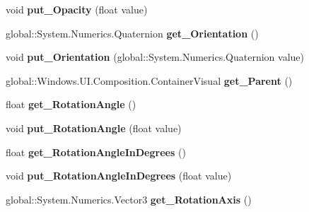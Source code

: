 \begin{DoxyCompactItemize}
void {\bfseries put\+\_\+\+Opacity} (float value)
\item 
\mbox{\label{interface_windows_1_1_u_i_1_1_composition_1_1_i_visual_a523dd4814f2f36f236cfe45314be2dd0}} 
global\+::\+System.\+Numerics.\+Quaternion {\bfseries get\+\_\+\+Orientation} ()
\item 
\mbox{\label{interface_windows_1_1_u_i_1_1_composition_1_1_i_visual_ac0ab83605b6773e888073ad16337ad3f}} 
void {\bfseries put\+\_\+\+Orientation} (global\+::\+System.\+Numerics.\+Quaternion value)
\item 
\mbox{\label{interface_windows_1_1_u_i_1_1_composition_1_1_i_visual_a134bed2c4c5639f5afd9a8ea755bd39a}} 
global\+::\+Windows.\+U\+I.\+Composition.\+Container\+Visual {\bfseries get\+\_\+\+Parent} ()
\item 
\mbox{\label{interface_windows_1_1_u_i_1_1_composition_1_1_i_visual_abefcdbefc02e45c1a846f29a0b173f5d}} 
float {\bfseries get\+\_\+\+Rotation\+Angle} ()
\item 
\mbox{\label{interface_windows_1_1_u_i_1_1_composition_1_1_i_visual_a57dea19f8a26f8727219fb97a7df55e7}} 
void {\bfseries put\+\_\+\+Rotation\+Angle} (float value)
\item 
\mbox{\label{interface_windows_1_1_u_i_1_1_composition_1_1_i_visual_aff19cf9eed640a1a17a06464d5ccc102}} 
float {\bfseries get\+\_\+\+Rotation\+Angle\+In\+Degrees} ()
\item 
\mbox{\label{interface_windows_1_1_u_i_1_1_composition_1_1_i_visual_ab9d2508241cebf4d3bbc2b46c988a77d}} 
void {\bfseries put\+\_\+\+Rotation\+Angle\+In\+Degrees} (float value)
\item 
\mbox{\label{interface_windows_1_1_u_i_1_1_composition_1_1_i_visual_a0fd647734a3c87cddfea98310e1b7406}} 
global\+::\+System.\+Numerics.\+Vector3 {\bfseries get\+\_\+\+Rotation\+Axis} ()

\end{DoxyCompactItemize}
